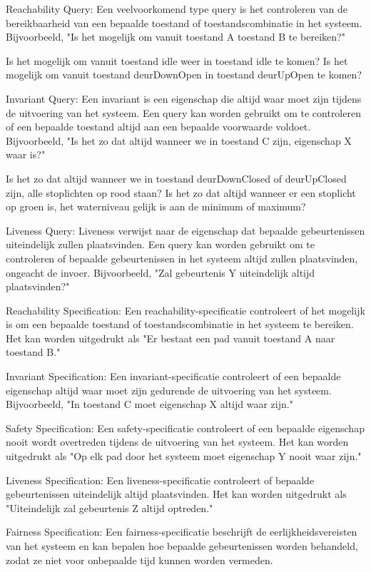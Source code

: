 Reachability Query:
Een veelvoorkomend type query is het controleren van de bereikbaarheid van een bepaalde toestand of toestandscombinatie in het systeem. Bijvoorbeeld, "Is het mogelijk om vanuit toestand A toestand B te bereiken?"

Is het mogelijk om vanuit toestand idle weer in toestand idle te komen?
Is het mogelijk om vanuit toestand deurDownOpen in toestand deurUpOpen te komen?

Invariant Query:
Een invariant is een eigenschap die altijd waar moet zijn tijdens de uitvoering van het systeem. Een query kan worden gebruikt om te controleren of een bepaalde toestand altijd aan een bepaalde voorwaarde voldoet. Bijvoorbeeld, "Is het zo dat altijd wanneer we in toestand C zijn, eigenschap X waar is?"

Is het zo dat altijd wanneer we in toestand deurDownClosed of deurUpClosed zijn, alle stoplichten op rood staan?
Is het zo dat altijd wanneer er een stoplicht op groen is, het waterniveau gelijk is aan de minimum of maximum?

Liveness Query:
Liveness verwijst naar de eigenschap dat bepaalde gebeurtenissen uiteindelijk zullen plaatsvinden. Een query kan worden gebruikt om te controleren of bepaalde gebeurtenissen in het systeem altijd zullen plaatsvinden, ongeacht de invoer. Bijvoorbeeld, "Zal gebeurtenis Y uiteindelijk altijd plaatsvinden?"

Reachability Specification:
Een reachability-specificatie controleert of het mogelijk is om een bepaalde toestand of toestandscombinatie in het systeem te bereiken. Het kan worden uitgedrukt als "Er bestaat een pad vanuit toestand A naar toestand B."

Invariant Specification:
Een invariant-specificatie controleert of een bepaalde eigenschap altijd waar moet zijn gedurende de uitvoering van het systeem. Bijvoorbeeld, "In toestand C moet eigenschap X altijd waar zijn."

Safety Specification:
Een safety-specificatie controleert of een bepaalde eigenschap nooit wordt overtreden tijdens de uitvoering van het systeem. Het kan worden uitgedrukt als "Op elk pad door het systeem moet eigenschap Y nooit waar zijn."

Liveness Specification:
Een liveness-specificatie controleert of bepaalde gebeurtenissen uiteindelijk altijd plaatsvinden. Het kan worden uitgedrukt als "Uiteindelijk zal gebeurtenis Z altijd optreden."

Fairness Specification:
Een fairness-specificatie beschrijft de eerlijkheidsvereisten van het systeem en kan bepalen hoe bepaalde gebeurtenissen worden behandeld, zodat ze niet voor onbepaalde tijd kunnen worden vermeden.

